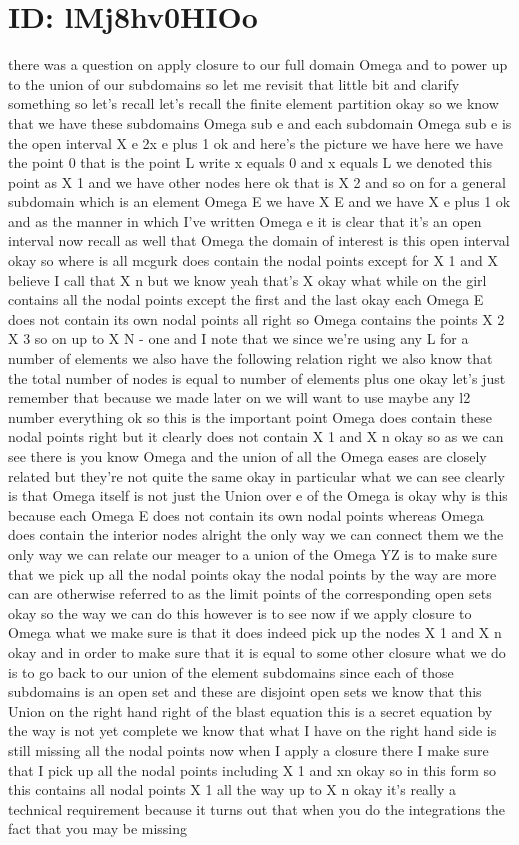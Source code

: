 \documentclass[10pt]{article}
\begin{document}
\section*{ID: lMj8hv0HIOo}
there was a question on apply closure to our full domain Omega and to power up to the union of our subdomains so let me revisit that little bit and clarify something so let's recall let's recall the finite element partition okay so we know that we have these subdomains Omega sub e and each subdomain Omega sub e is the open interval X e 2x e plus 1 ok and here's the picture we have here we have the point 0 that is the point L write x equals 0 and x equals L we denoted this point as X 1 and we have other nodes here ok that is X 2 and so on for a general subdomain which is an element Omega E we have X E and we have X e plus 1 ok and as the manner in which I've written Omega e it is clear that it's an open interval now recall as well that Omega the domain of interest is this open interval okay so where is all mcgurk does contain the nodal points except for X 1 and X believe I call that X n but we know yeah that's X okay what while on the girl contains all the nodal points except the first and the last okay each Omega E does not contain its own nodal points all right so Omega contains the points X 2 X 3 so on up to X N - one and I note that we since we're using any L for a number of elements we also have the following relation right we also know that the total number of nodes is equal to number of elements plus one okay let's just remember that because we made later on we will want to use maybe any l2 number everything ok so this is the important point Omega does contain these nodal points right but it clearly does not contain X 1 and X n okay so as we can see there is you know Omega and the union of all the Omega eases are closely related but they're not quite the same okay in particular what we can see clearly is that Omega itself is not just the Union over e of the Omega is okay why is this because each Omega E does not contain its own nodal points whereas Omega does contain the interior nodes alright the only way we can connect them we the only way we can relate our meager to a union of the Omega YZ is to make sure that we pick up all the nodal points okay the nodal points by the way are more can are otherwise referred to as the limit points of the corresponding open sets okay so the way we can do this however is to see now if we apply closure to Omega what we make sure is that it does indeed pick up the nodes X 1 and X n okay and in order to make sure that it is equal to some other closure what we do is to go back to our union of the element subdomains since each of those subdomains is an open set and these are disjoint open sets we know that this Union on the right hand right of the blast equation this is a secret equation by the way is not yet complete we know that what I have on the right hand side is still missing all the nodal points now when I apply a closure there I make sure that I pick up all the nodal points including X 1 and xn okay so in this form so this contains all nodal points X 1 all the way up to X n okay it's really a technical requirement because it turns out that when you do the integrations the fact that you may be missing 
\end{document}
